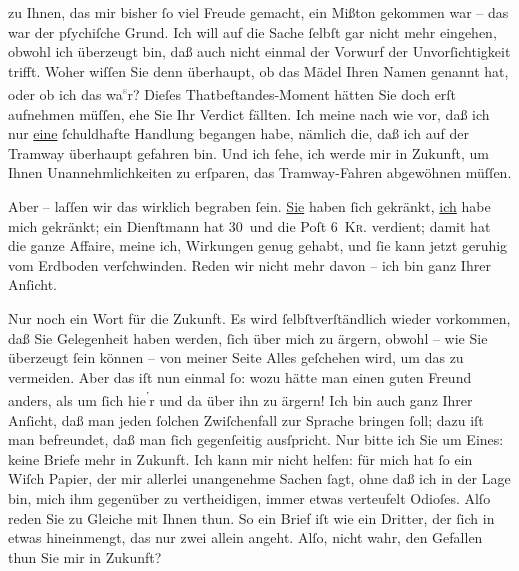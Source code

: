                zu Ihnen, das mir bisher{ }ſo viel Freude gemacht, ein Mißton gekommen war – das war
               der pſychiſche Grund. Ich will auf die Sache{ }ſelbſt gar nicht mehr eingehen, obwohl
               ich überzeugt bin, daß auch nicht einmal der Vorwurf der Unvorſich{\pb}tigkeit trifft. Woher wiſſen Sie denn überhaupt, ob
               das Mädel Ihren Namen
               genannt hat, oder ob ich das wa\substVorne{}\textsuperscript{\textcolor{gray}{s}}\substDazwischen{}r\substHinten{}? Dieſes Thatbeſtandes-Moment hätten Sie doch erſt aufnehmen müſſen, ehe Sie
               Ihr Verdict fällten. Ich meine nach wie vor, daß ich nur \uline{eine}{ }ſchuldhafte Handlung begangen habe, nämlich die, daß ich auf der
               Tramway überhaupt gefahren bin. Und ich{ }ſehe, ich werde mir in Zukunft, um Ihnen
               Unannehmlichkeiten zu erſparen, das Tramway-Fahren abgewöhnen müſſen.\pend
           
\pstart
           Aber – laſſen wir das wirklich begraben{ }ſein. \uline{Sie}
               haben{ }ſich gekränkt, \uline{ich} habe mich gekränkt; ein
               Dienſtmann hat 30 und die Poſt 6 \textsc{Kr.} verdient; damit hat
               die ganze Affaire, meine ich, Wirkungen genug gehabt, und{ }ſie kann jetzt geruhig vom
               Erdboden verſchwinden. Reden wir nicht mehr davon – ich bin ganz Ihrer Anſicht.\pend
           
\pstart
           Nur noch ein Wort für die Zukunft. Es wird{ }ſelbſtverſtändlich wieder vorkommen, daß
               Sie Gelegenheit haben werden,{ }ſich über mich zu ärgern, obwohl – wie Sie überzeugt{ }ſein können – von meiner Seite Alles geſchehen wird, um das zu {\pb}vermeiden. Aber das iſt nun einmal{ }ſo: wozu hätte
               man einen guten Freund anders, als um{ }ſich hie\substVorne{}\textsuperscript{’}\substDazwischen{}r\substHinten{} und da über ihn zu ärgern! Ich bin auch ganz Ihrer Anſicht, daß man jeden{ }ſolchen Zwiſchenfall zur Sprache bringen{ }ſoll; dazu iſt man befreundet, daß man{ }ſich
               gegenſeitig ausſpricht. Nur bitte ich Sie um Eines: keine Briefe mehr in Zukunft. Ich
               kann mir nicht \strikeout{\textcolor{gray}{hef}} helfen: für mich hat{ }ſo ein Wiſch Papier, der mir  allerlei unangenehme Sachen{ }ſagt, ohne daß ich in der Lage bin, mich ihm
               gegenüber zu vertheidigen, immer etwas verteufelt Odioſes. Alſo reden Sie zu\strikeout{\textcolor{gray}{r}} Gleiche mit Ihnen thun. So ein Brief iſt wie ein Dritter, der{ }ſich in etwas
               hineinmengt, das nur zwei allein angeht. Alſo, nicht wahr, den Gefallen thun Sie mir
                  \strikeout{\textcolor{gray}{ehe}} in Zukunft? {\dotsfour}\pend
           
